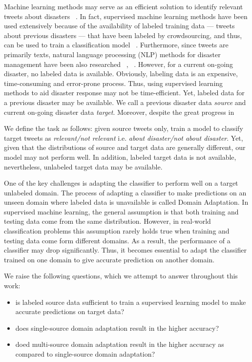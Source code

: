 Machine learning methods may serve as an efficient solution to identify relevant tweets about disasters ~\citep{tweedr}. In fact, supervised machine learning methods have been used extensively because of the availability of labeled training data --- tweets about previous disasters --- that have been labeled by crowdsourcing, and thus, can be used to train a classification model ~\citep{starbird}. Furthermore, since tweets are primarily texts, natural language processing (NLP) methods for disaster management have been also researched ~\citep{sakaki}, ~\citep{terpstra}. 
However, for a current on-going disaster, no labeled data is available. Obviously, labeling data is an expensive, time-consuming and error-prone process. Thus, using supervised learning methods to aid disaster response may not be time-efficient. Yet, labeled data for a previous disaster may be available. We call a previous disaster data \textit{source} and current on-going disaster data \textit{target}. Moreover, despite the great progress in 

We define the task as follows: given source tweets only, train a model to classify target tweets as \textit{relevant/not relevant} i.e. \textit{about disaster/not about disaster}. Yet, given that the distributions of source and target data are generally different, our model may not perform well. In addition, labeled target data is not available, nevertheless, unlabeled target data may be available.

One of the key challenges is adapting the classifier to perform well on a target unlabeled domain. The process of adapting a classifier to make predictions on an unseen domain where labeled data is unavailable is called Domain Adaptation. In supervised machine learning, the general assumption is that both training and testing data come from the same distribution. However, in real-world classification problems this assumption rarely holds true when training and testing data come form different domains. As a result, the performance of a classifier may drop significantly. Thus, it becomes essential to adapt the classifier trained on one domain to give accurate prediction on another domain.

We raise the following questions, which we attempt to answer throughout this work:

\begin{itemize}
  \item is labeled source data sufficient to train a supervised learning model to make accurate predictions on target data?
  \item does single-source domain adaptation result in the higher accuracy?
  \item doed multi-source domain adaptation result in the higher accuracy as compared to single-source domain adaptation?
\end{itemize}

